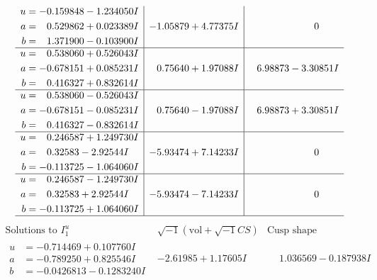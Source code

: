 \documentclass[1p]{elsarticle_modified}
\theoremstyle{definition}
\newcommand{\I}{\sqrt{-1}}
\begin{document}
$$\begin{array}{c|c|c}
\begin{aligned}
u &= -0.159848 - 1.234050 I \\
a &= \phantom{-}0.529862 + 0.023389 I \\
b &= \phantom{-}1.371900 - 0.103900 I\end{aligned}
 & -1.05879 + 4.77375 I & \phantom{-0.000000 } 0 \\ \hline\begin{aligned}
u &= \phantom{-}0.538060 + 0.526043 I \\
a &= -0.678151 + 0.085231 I \\
b &= \phantom{-}0.416327 + 0.832614 I\end{aligned}
 & \phantom{-}0.75640 + 1.97088 I & \phantom{-}6.98873 - 3.30851 I \\ \hline\begin{aligned}
u &= \phantom{-}0.538060 - 0.526043 I \\
a &= -0.678151 - 0.085231 I \\
b &= \phantom{-}0.416327 - 0.832614 I\end{aligned}
 & \phantom{-}0.75640 - 1.97088 I & \phantom{-}6.98873 + 3.30851 I \\ \hline\begin{aligned}
u &= \phantom{-}0.246587 + 1.249730 I \\
a &= \phantom{-}0.32583 - 2.92544 I \\
b &= -0.113725 - 1.064060 I\end{aligned}
 & -5.93474 + 7.14233 I & \phantom{-0.000000 } 0 \\ \hline\begin{aligned}
u &= \phantom{-}0.246587 - 1.249730 I \\
a &= \phantom{-}0.32583 + 2.92544 I \\
b &= -0.113725 + 1.064060 I\end{aligned}
 & -5.93474 - 7.14233 I & \phantom{-0.000000 } 0\\
 \hline 
 \end{array}$$\newpage$$\begin{array}{c|c|c}  
\text{Solutions to }I^u_{1}& \I (\text{vol} + \sqrt{-1}CS) & \text{Cusp shape}\\
 \hline 
\begin{aligned}
u &= -0.714469 + 0.107760 I \\
a &= -0.789250 + 0.825546 I \\
b &= -0.0426813 - 0.1283240 I\end{aligned}
 & -2.61985 + 1.17605 I & \phantom{-}1.036569 - 0.187938 I \\ \hline\begin{aligned}

\end{aligned}
\end{array}$$
\end{document}
